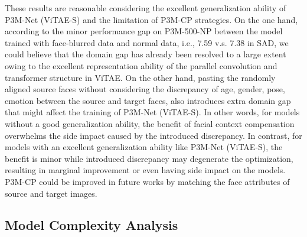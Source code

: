 \documentclass[twocolumn]{svjour3}
\begin{document}
These results are reasonable considering the excellent generalization ability of P3M-Net (ViTAE-S) and the limitation of P3M-CP strategies. On the one hand, according to the minor performance gap on P3M-500-NP between the model trained with face-blurred data and normal data, i.e., 7.59 v.s. 7.38 in SAD, we could believe that the domain gap has already been resolved to a large extent owing to the excellent representation ability of the parallel convolution and transformer structure in ViTAE. On the other hand, pasting the randomly aligned source faces without considering the discrepancy of age, gender, pose, emotion between the source and target faces, also introduces extra domain gap that might affect the training of P3M-Net (ViTAE-S). In other words, for models without a good generalization ability, the benefit of facial context compensation overwhelms the side impact caused by the introduced discrepancy. In contrast, for models with an excellent generalization ability like P3M-Net (ViTAE-S), the benefit is minor while introduced discrepancy may degenerate the optimization, resulting in marginal improvement or even having side impact on the models. P3M-CP could be improved in future works by matching the face attributes of source and target images.



\subsection{Model Complexity Analysis}

\begin{table}[htb]
\begin{center}
\end{center}
\caption{Model complexity and inference speed comparison. In inference speed test, the input size is 512  512, and the inference time is averaged over 100 trials. P3M(R), P3M(S), and
P3M(V) stand for the P3M-Net variants based on ResNet-34, Swin-T, and ViTAE-S backbones, respectively.}
\label{tab:model_complexity_and_speed_sota}
\end{table}
\end{document}

